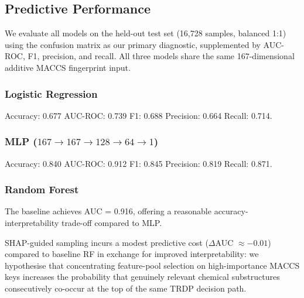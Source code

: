 \documentclass[letterpaper]{article} %
\begin{document}
\subsection{Predictive Performance}
We evaluate all models on the held-out test set (16,728 samples, balanced 1:1) using the confusion matrix as our primary diagnostic, supplemented by AUC-ROC, F1, precision, and recall.  All three models share the same 167-dimensional additive MACCS fingerprint input.

\subsubsection{Logistic Regression}
Accuracy: 0.677 \quad AUC-ROC: 0.739 \quad F1: 0.688 \quad Precision: 0.664 \quad Recall: 0.714.

\subsubsection{MLP ($167{\rightarrow}167{\rightarrow}128{\rightarrow}64{\rightarrow}1$)}
Accuracy: 0.840 \quad AUC-ROC: 0.912 \quad F1: 0.845 \quad Precision: 0.819 \quad Recall: 0.871.

\subsubsection{Random Forest}
The baseline achieves AUC = 0.916, offering a reasonable accuracy-interpretability trade-off compared to MLP.

SHAP-guided sampling incurs a modest predictive cost ($\Delta$AUC $\approx -0.01$) compared to baseline RF in exchange for improved interpretability: we hypothesise that concentrating feature-pool selection on high-importance MACCS keys increases the probability that genuinely relevant chemical substructures consecutively co-occur at the top of the same TRDP decision path. 

\begin{table}[h]
\centering
\caption{Baseline vs.\ SHAP-guided RF ($T=200$, $d_{\max}=20$) on the test set.}
\label{tab:shap_guided_d20}
\end{table}
\end{document}
